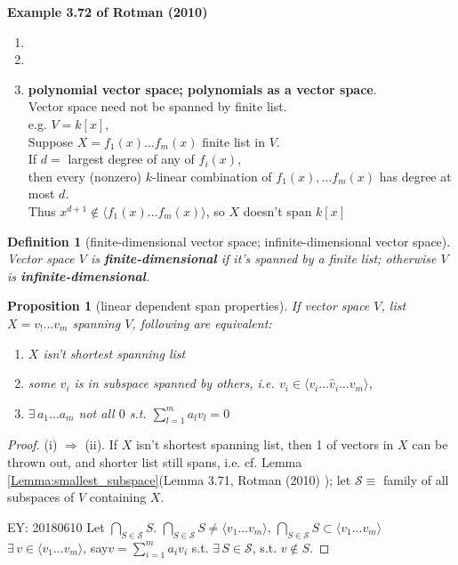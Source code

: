 \documentclass[10pt]{amsart}
\newtheorem{proposition}{Proposition}
\newtheorem{definition}{Definition}
\begin{document}
\begin{multicols*}{2}
\textbf{Example 3.72 of Rotman (2010) \cite{JRotman2010}}
\begin{enumerate}
	\item[(i)]
	\item[(ii)]
	\item[(iii)] \textbf{polynomial vector space; polynomials as a vector space}.  \\
	Vector space need not be spanned by finite list. \\
	e.g. $V=k[x]$, \\
	Suppose $X= f_1(x) \dots f_m(x)$ finite list in $V$. \\
	If $d= $ largest degree of any of $f_i(x)$, \\
	then every (nonzero) $k$-linear combination of $f_1(x), \dots f_m(x)$ has degree at most $d$. \\
	Thus $x^{d+1} \notin \langle f_1(x) \dots f_m(x) \rangle$, so $X$ doesn't span $k[x]$
\end{enumerate}

\begin{definition}[finite-dimensional vector space; infinite-dimensional vector space]
	Vector space $V$ is \textbf{finite-dimensional} if it's spanned by a finite list; otherwise $V$ is \textbf{infinite-dimensional}.
\end{definition}

\begin{proposition}[linear dependent span properties]
If vector space $V$, list $X=v_! \dots v_m$ spanning $V$, following are equivalent:
	\begin{enumerate}
		\item[(i)] $X$ isn't shortest spanning list 
		\item[(ii)] some $v_i$ is in subspace spanned by others, i.e. $v_i \in \langle v_i \dots \widehat{v}_i \dots v_m \rangle$, 
		\item[(iii)]		$\exists \, a_1 \dots a_m$ not all $0$ s.t. $\sum_{l=1}^m a_l v_l = 0$
	\end{enumerate}
\end{proposition}

\begin{proof}
(i) $\Longrightarrow$ (ii). If $X$ isn't shortest spanning list, then 1 of vectors in $X$ can be thrown out, and shorter list still spans, i.e. cf. Lemma \ref{Lemma:smallest_subspace}(Lemma 3.71, Rotman (2010) \cite{JRotman2010}); let $\mathcal{S} \equiv $ family of all subspaces of $V$ containing $X$. 

EY: 20180610 
Let $\bigcap_{S\in \mathcal{S}} S$. $\bigcap_{S \in \mathcal{S}} S \neq \langle v_1 \dots v_m \rangle$, $\bigcap_{S \in \mathcal{S}} S \subset \langle v_1 \dots v_m \rangle$ \\
$\exists \, v \in \langle v_1 \dots v_m \rangle$, say$v= \sum_{i=1}^m a_i v_i$ s.t. $\exists \, S \in \mathcal{S}$, s.t. $v\notin S$.  


\end{proof}
\end{multicols*}
\end{document}
